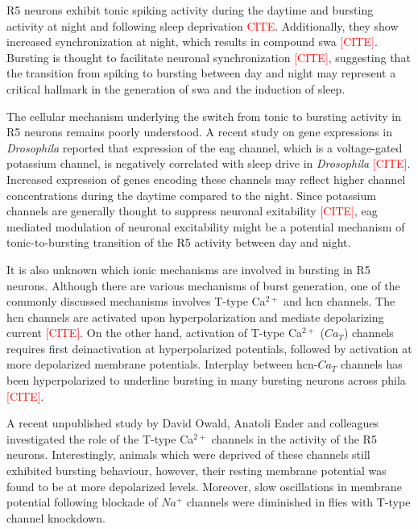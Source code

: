 \documentclass[../main.tex]{subfiles}
\begin{document}
R5 neurons exhibit tonic spiking activity during the daytime and bursting activity at night and following sleep deprivation \textcolor{red}{CITE}. Additionally, they show increased synchronization at night, which results in compound \gls{swa} \textcolor{red}{[CITE]}. Bursting is thought to facilitate neuronal synchronization \textcolor{red}{[CITE]}, suggesting that the transition from spiking to bursting between day and night may represent a critical hallmark in the generation of \gls{swa} and the induction of sleep.

The cellular mechanism underlying the switch from tonic to bursting activity in R5 neurons remains poorly understood. A recent study on gene expressions in \textit{Drosophila} reported that expression of the \gls{eag} channel, which is a voltage-gated potassium channel, is negatively correlated with sleep drive in \textit{Drosophila} \textcolor{red}{[CITE]}.
Increased expression of genes encoding these channels may reflect higher channel concentrations during the daytime compared to the night. Since potassium channels are generally thought to suppress neuronal exitability \textcolor{red}{[CITE]}, \gls{eag} mediated modulation of neuronal excitability might be a potential mechanism of tonic-to-bursting transition of the R5 activity between day and night.

It is also unknown which ionic mechanisms are involved in bursting in R5 neurons. Although there are various mechanisms of burst generation, one of the commonly discussed mechanisms involves T-type Ca$^{2+}$ and \gls{hcn} channels. The \gls{hcn} channels are activated upon hyperpolarization and mediate depolarizing current \textcolor{red}{[CITE]}. On the other hand, activation of T-type Ca$^{2+}$ ($Ca_T$) channels requires first deinactivation at hyperpolarized potentials, followed by activation at more depolarized membrane potentials. Interplay between \gls{hcn}-$Ca_T$ channels has been hyperpolarized to underline bursting in many bursting neurons across phila \textcolor{red}{[CITE]}.

A recent unpublished study by David Owald, Anatoli Ender and colleagues investigated the role of the T-type Ca$^{2+}$ channels in the activity of the R5 neurons. Interestingly, animals which were deprived of these channels still exhibited bursting behaviour, however, their resting membrane potential was found to be at more depolarized levels. Moreover, slow oscillations in membrane potential following blockade of $Na^+$ channels were diminished in flies with T-type channel knockdown.
\end{document}
